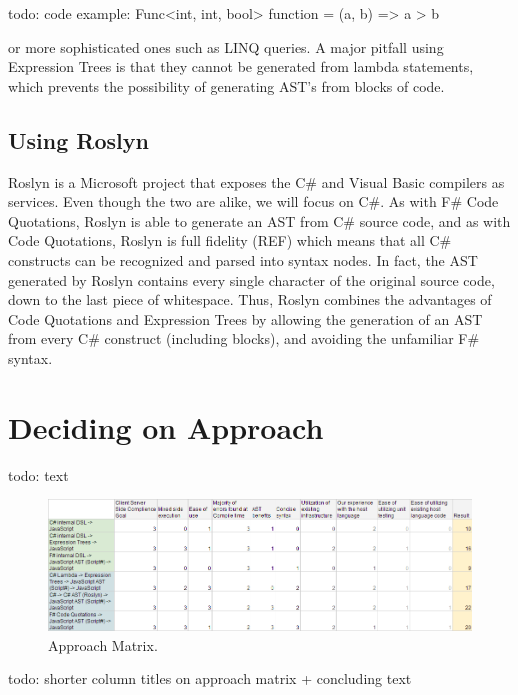 			todo: code example: Func<int, int, bool> function = (a, b) => a > b

			or more sophisticated ones such as LINQ queries.  A major pitfall using Expression Trees is that they cannot be generated from lambda statements, which prevents the possibility of generating AST’s from blocks of code.

		\subsection{Using Roslyn} %
		\label{sub:using_roslyn}
			Roslyn is a Microsoft project that exposes the C\# and Visual Basic compilers as services. Even though the two are alike, we will focus on C\#. As with F\# Code Quotations, Roslyn is able to generate an AST from C\# source code, and as with Code Quotations, Roslyn is full fidelity (REF) which means that all C\# constructs can be recognized and parsed into syntax nodes. In fact, the AST generated by Roslyn contains every single character of the original source code, down to the last piece of whitespace. Thus, Roslyn combines the advantages of Code Quotations and Expression Trees by allowing the generation of an AST from every C\# construct (including blocks), and avoiding the unfamiliar F\# syntax.


\section{Deciding on Approach} %
\label{sec:deciding_on_approach}
	todo: text

						\begin{figure}[H]
			\begin{center}
				\centerline{\includegraphics[width=16cm]{resources/images/ApproachMatrix.png}}
			\end{center}
			\caption{Approach Matrix.}
			\label{approachMatrix}
		\end{figure}

	todo: shorter column titles on approach matrix + concluding text
